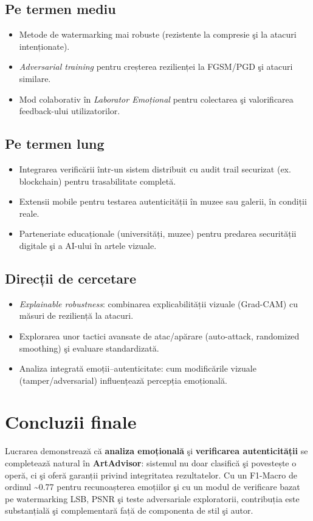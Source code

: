 \subsection*{Pe termen mediu}
\begin{itemize}
  \item Metode de watermarking mai robuste (rezistente la compresie şi la atacuri intenționate).
  \item \emph{Adversarial training} pentru creșterea rezilienței la FGSM/PGD şi atacuri similare.
  \item Mod colaborativ în \emph{Laborator Emoțional} pentru colectarea şi valorificarea feedback-ului utilizatorilor.
\end{itemize}

\subsection*{Pe termen lung}
\begin{itemize}
  \item Integrarea verificării într-un sistem distribuit cu audit trail securizat (ex. blockchain) pentru trasabilitate completă.
  \item Extensii mobile pentru testarea autenticității în muzee sau galerii, în condiții reale.
  \item Parteneriate educaționale (universități, muzee) pentru predarea securității digitale şi a AI-ului în artele vizuale.
\end{itemize}

\subsection*{Direcții de cercetare}
\begin{itemize}
  \item \emph{Explainable robustness}: combinarea explicabilității vizuale (Grad-CAM) cu măsuri de reziliență la atacuri.
  \item Explorarea unor tactici avansate de atac/apărare (auto-attack, randomized smoothing) şi evaluare standardizată.
  \item Analiza integrată emoții--autenticitate: cum modificările vizuale (tamper/adversarial) influențează percepția emoțională.
\end{itemize}

\section{Concluzii finale}
Lucrarea demonstrează că \textbf{analiza emoțională} şi \textbf{verificarea autenticității} se completează natural în \textbf{ArtAdvisor}: sistemul nu doar clasifică şi povestește o operă, ci şi oferă garanții privind integritatea rezultatelor. Cu un F1-Macro de ordinul \textasciitilde 0.77 pentru recunoașterea emoțiilor şi cu un modul de verificare bazat pe watermarking LSB, PSNR şi teste adversariale exploratorii, contribuția este substanțială şi complementară față de componenta de stil şi autor. 


